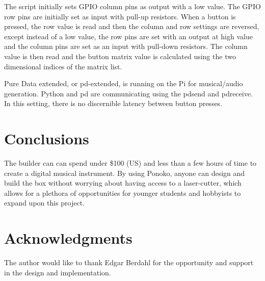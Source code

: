 \documentclass{nime-alternate}
\begin{document}
The script initially sets GPIO column pins as output with a low value. The GPIO row pins are initially set as input with pull-up resistors. When a button is pressed, the row value is read and then the column and row settings are reversed, except instead of a low value, the row pins are set with an output at high value and the column pins are set as an input with pull-down resistors. The column value is then read and the button matrix value is calculated using the two dimensional indices of the matrix list.

Pure Data extended, or pd-extended, is running on the Pi for musical/audio generation. Python and pd are communicating using the pdsend and pdreceive. In this setting, there is no discernible latency between button presses.

\section{Conclusions}
The builder can can spend under \$100 (US) and less than a few hours of time to create a digital musical instrument. By using Ponoko, anyone can design and build the box without worrying about having access to a laser-cutter, which allows for a plethora of opportunities for younger students and hobbyists to expand upon this project.

\section{Acknowledgments}
The author would like to thank Edgar Berdahl for the opportunity and support in the design and implementation.




\balancecolumns 
\end{document}
